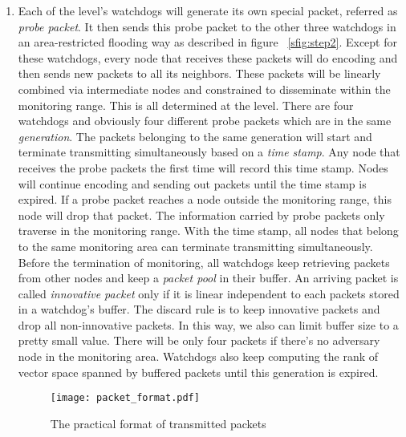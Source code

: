 \documentclass[conference]{IEEEtran}
\begin{document}
\begin{enumerate}
\item \label{st2}Each of the  level's watchdogs will generate its own special packet, referred as \emph{probe packet}. It then sends this probe packet to the other three watchdogs in an area-restricted flooding way as described in figure ~\ref{sfig:step2}. Except for these watchdogs, every node that receives these packets will do encoding and then sends new packets to all its neighbors. These packets will be linearly combined via intermediate nodes and constrained to disseminate within the monitoring range. This is all determined at the  level. There are four watchdogs and obviously four different probe packets which are in the same \emph{generation}. The packets belonging to the same generation will start and terminate transmitting simultaneously based on a \emph{time stamp}. Any node that receives the probe packets the first time will record this time stamp. Nodes will continue encoding and sending out packets until the time stamp is expired. If a probe packet reaches a node outside the monitoring range, this node will drop that packet. The information carried by probe packets only traverse in the monitoring range. With the time stamp, all nodes that belong to the same monitoring area can terminate transmitting simultaneously. Before the termination of monitoring, all watchdogs keep retrieving packets from other nodes and keep a \emph{packet pool} in their buffer. An arriving packet is called \emph{innovative packet} only if it is linear independent to each packets stored in a watchdog's buffer. The discard rule is to keep innovative packets and drop all non-innovative packets. In this way, we also can limit buffer size to a pretty small value. There will be only four packets if there's no adversary node in the monitoring area. Watchdogs also keep computing the rank of vector space spanned by buffered packets until this generation is expired. \\
\begin{figure}[!t]
\centering
\texttt{[image: packet\_format.pdf]}
\caption{The practical format of transmitted packets}
\label{fig_packet_form}
\end{figure}

\end{enumerate}
\end{document}
